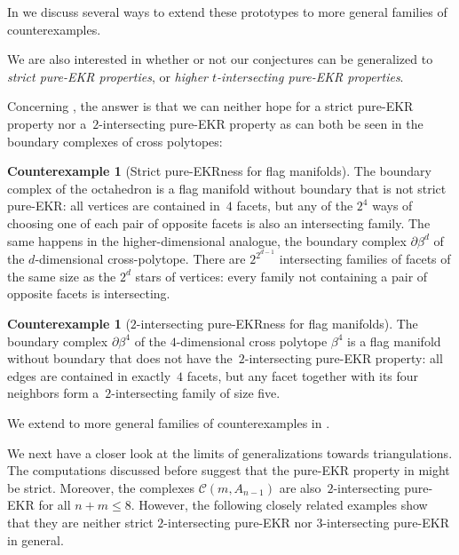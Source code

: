 \documentclass[a4paper,12pt]{amsart}
\theoremstyle{plain}
\theoremstyle{definition}
\newtheorem{counterexample}[theorem]{Counterexample}
\newcommand{\C}{\mathcal C}
\begin{document}
In  we discuss several ways to extend these prototypes to more general families of counterexamples.

\medskip

We are also interested in whether or not our conjectures can be generalized to \emph{strict pure-EKR properties}, or \emph{higher $t$-intersecting pure-EKR properties}.

\medskip

Concerning , the answer is that we can neither hope for a strict pure-EKR property nor a~$2$-intersecting pure-EKR property as can both be seen in the boundary complexes of cross polytopes:

\begin{counterexample}[Strict pure-EKRness for flag manifolds]
\label{ex:counterex1}
  The boundary complex of the octahedron is a flag manifold without boundary that is  not strict pure-EKR: all vertices are contained in~$4$ facets, but any of the $2^4$ ways of choosing one of each pair of opposite facets is also an intersecting family. The same happens in the higher-dimensional analogue, the boundary complex $\partial \beta^d$ of the $d$-dimensional cross-polytope. There are $2^{2^{d-1}}$ intersecting families of facets of the same size as the $2^d$ stars of vertices: every family not containing a pair of opposite facets is intersecting.
\end{counterexample}

\begin{counterexample}[$2$-intersecting pure-EKRness for flag manifolds]
\label{ex:counterex2}
  The boun\-dary complex $\partial \beta^4$ of the $4$-dimensional cross polytope $\beta^4$ is a flag manifold without boundary that does not have the~$2$-intersecting pure-EKR property: all edges are contained in exactly~$4$ facets, but any facet together with its four neighbors form a~$2$-intersecting family of size five.
\end{counterexample}

We extend  to more general families of counterexamples in .

\medskip

We next have a closer look at the limits of generalizations towards triangulations.
The computations discussed before  suggest that the pure-EKR property in  might be strict.
Moreover, the complexes $\C(m,A_{n-1})$ are also~$2$-intersecting pure-EKR for all $n+m \leq 8$.
However, the following closely related examples show that they are neither strict $2$-inter\-sec\-ting pure-EKR nor $3$-intersecting pure-EKR in general.
\end{document}
